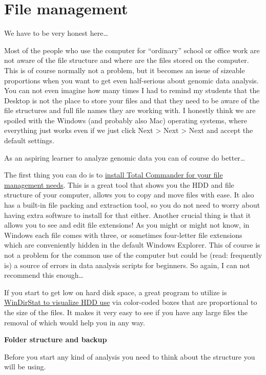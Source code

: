 \documentclass[]{book}
\begin{document}
\section{File management}\label{file-management}

We have to be very honest here\ldots{}

Most of the people who use the computer for ``ordinary'' school or
office work are not aware of the file structure and where are the files
stored on the computer. This is of course normally not a problem, but it
becomes an issue of sizeable proportions when you want to get even
half-serious about genomic data analysis. You can not even imagine how
many times I had to remind my students that the Desktop is not the place
to store your files and that they need to be aware of the file
structures and full file names they are working with. I honestly think
we are spoiled with the Windows (and probably also Mac) operating
systems, where everything just works even if we just click Next
\textgreater{} Next \textgreater{} Next and accept the default settings.

As an aspiring learner to analyze genomic data you can of course do
better\ldots{}

The first thing you can do is to \href{https://www.ghisler.com/}{install
Total Commander for your file management needs}. This is a great tool
that shows you the HDD and file structure of your computer, allows you
to copy and move files with ease. It also has a built-in file packing
and extraction tool, so you do not need to worry about having extra
software to install for that either. Another crucial thing is that it
allows you to see and edit file extensions! As you might or might not
know, in Windows each file comes with three, or sometimes four-letter
file extensions which are conveniently hidden in the default Windows
Explorer. This of course is not a problem for the common use of the
computer but could be (read: frequently is) a source of errors in data
analysis scripts for beginners. So again, I can not recommend this
enough\ldots{}

If you start to get low on hard disk space, a great program to utilize
is \href{https://windirstat.net/}{WinDirStat to visualize HDD use} via
color-coded boxes that are proportional to the size of the files. It
makes it very easy to see if you have any large files the removal of
which would help you in any way.

\textbf{Folder structure and backup}

Before you start any kind of analysis you need to think about the
structure you will be using.
\end{document}
